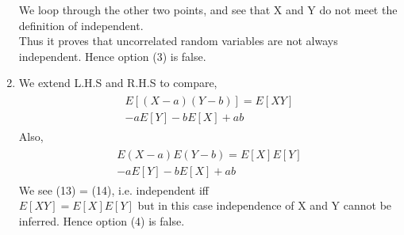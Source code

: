 \documentclass[journal,12pt,twocolumn]{IEEEtran}
\begin{document}
\begin{enumerate}
We loop through the other two points, and see that X and Y do not meet the definition of independent.\\
Thus it proves that uncorrelated random variables are not always independent. Hence option (3) is false.\\
    \item We extend L.H.S and R.H.S to compare,
\begin{align}\tag{13}
    \begin{split}
        E[(X-a)(Y-b)] = E[XY]\\ - aE[Y] - bE[X] + ab
    \end{split}
\end{align}
Also,
\begin{align}\tag{14}
    \begin{split}
        E(X-a) E(Y-b) = E[X]E[Y]\\ - aE[Y] - bE[X] + ab
    \end{split}
\end{align}
We see (13) = (14), i.e. independent iff\\
$E[XY] = E[X] E[Y]$ but in this case independence of X and Y cannot be inferred. Hence option (4) is false.
\end{enumerate}
\end{document}
